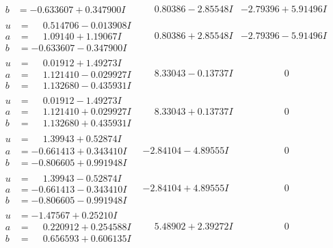 \documentclass[1p]{elsarticle_modified}
\theoremstyle{definition}
\begin{document}
$$\begin{array}{c|c|c}
\begin{aligned}
b &= -0.633607 + 0.347900 I\end{aligned}
 & \phantom{-}0.80386 - 2.85548 I & -2.79396 + 5.91496 I \\ \hline\begin{aligned}
u &= \phantom{-}0.514706 - 0.013908 I \\
a &= \phantom{-}1.09140 + 1.19067 I \\
b &= -0.633607 - 0.347900 I\end{aligned}
 & \phantom{-}0.80386 + 2.85548 I & -2.79396 - 5.91496 I \\ \hline\begin{aligned}
u &= \phantom{-}0.01912 + 1.49273 I \\
a &= \phantom{-}1.121410 - 0.029927 I \\
b &= \phantom{-}1.132680 - 0.435931 I\end{aligned}
 & \phantom{-}8.33043 - 0.13737 I & \phantom{-0.000000 } 0 \\ \hline\begin{aligned}
u &= \phantom{-}0.01912 - 1.49273 I \\
a &= \phantom{-}1.121410 + 0.029927 I \\
b &= \phantom{-}1.132680 + 0.435931 I\end{aligned}
 & \phantom{-}8.33043 + 0.13737 I & \phantom{-0.000000 } 0 \\ \hline\begin{aligned}
u &= \phantom{-}1.39943 + 0.52874 I \\
a &= -0.661413 + 0.343410 I \\
b &= -0.806605 + 0.991948 I\end{aligned}
 & -2.84104 - 4.89555 I & \phantom{-0.000000 } 0 \\ \hline\begin{aligned}
u &= \phantom{-}1.39943 - 0.52874 I \\
a &= -0.661413 - 0.343410 I \\
b &= -0.806605 - 0.991948 I\end{aligned}
 & -2.84104 + 4.89555 I & \phantom{-0.000000 } 0 \\ \hline\begin{aligned}
u &= -1.47567 + 0.25210 I \\
a &= \phantom{-}0.220912 + 0.254588 I \\
b &= \phantom{-}0.656593 + 0.606135 I\end{aligned}
 & \phantom{-}5.48902 + 2.39272 I & \phantom{-0.000000 } 0 \\ \hline\begin{aligned}

\end{aligned}
\end{array}$$
\end{document}
